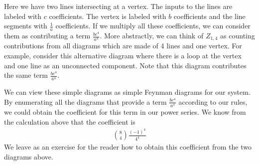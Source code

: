 \documentclass[book.tex]{subfiles}
\begin{document}
Here we have two lines intersecting at a vertex. The inputs to the lines are labeled with $c$ coefficients. The vertex is labeled with $b$ coefficients and the line segments with $\frac{1}{a}$ coefficients. If we multiply all these coefficients, we can consider them as contributing a term $\frac{bc^4}{a^4}$. More abstractly, we can think of $Z_{1,4}$ as counting contributions from all diagrams which are made of 4 lines and one vertex. For example, consider this alternative diagram where there is a loop at the vertex and one line as an unconnected component. Note that this diagram contributes the same term $\frac{bc^4}{a^4}$. \\

We can view these simple diagrams as simple Feynman diagrams for our system. By enumerating all the diagrams that provide a term $\frac{bc^4}{a^4}$ according to our rules, we could obtain the coefficient for this term in our power series. We know from the calculation above that the coefficient is
\begin{align}
    {8 \choose 4}\frac{(-1)^4}{4^4}
\end{align}
We leave as an exercise for the reader how to obtain this coefficient from the two diagrams above.




\end{document}
